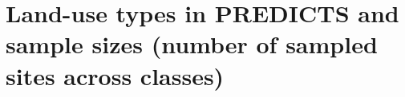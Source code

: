 \documentclass[11pt]{article}
\begin{document}

\clearpage

\section{Land-use types in PREDICTS and sample sizes (number of sampled sites across classes)}
\end{document}
